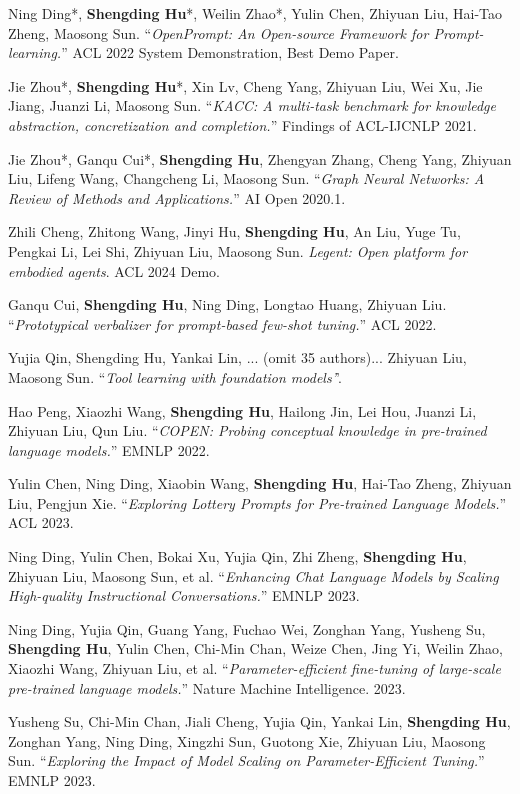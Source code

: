 \begin{resume}
\begin{achievements}
        \item Ning Ding*, \textbf{Shengding Hu}*, Weilin Zhao*, Yulin Chen, Zhiyuan Liu, Hai-Tao Zheng, Maosong Sun. ``\textit{OpenPrompt: An Open-source Framework for Prompt-learning.}'' ACL 2022 System Demonstration, Best Demo Paper.
        \item Jie Zhou*, \textbf{Shengding Hu}*, Xin Lv, Cheng Yang, Zhiyuan Liu, Wei Xu, Jie Jiang, Juanzi Li, Maosong Sun. ``\textit{KACC: A multi-task benchmark for knowledge abstraction, concretization and completion.}'' Findings of  ACL-IJCNLP 2021.
        \item Jie Zhou*, Ganqu Cui*, \textbf{Shengding Hu}, Zhengyan Zhang, Cheng Yang, Zhiyuan Liu, Lifeng Wang, Changcheng Li, Maosong Sun. ``\textit{Graph Neural Networks: A Review of Methods and Applications.}'' AI Open 2020.1.
        \item Zhili Cheng, Zhitong Wang, Jinyi Hu, \textbf{Shengding Hu}, An Liu, Yuge Tu, Pengkai Li, Lei Shi, Zhiyuan Liu, Maosong Sun. \textit{Legent: Open platform for embodied agents}. ACL 2024 Demo.
        \item Ganqu Cui, \textbf{Shengding Hu}, Ning Ding, Longtao Huang, Zhiyuan Liu. ``\textit{Prototypical verbalizer for prompt-based few-shot tuning.}'' ACL 2022.
        \item Yujia Qin, Shengding Hu, Yankai Lin, ... (omit 35 authors)... Zhiyuan Liu, Maosong Sun. ``\textit{Tool learning with foundation models'}'.   
        \item Hao Peng, Xiaozhi Wang, \textbf{Shengding Hu}, Hailong Jin, Lei Hou, Juanzi Li, Zhiyuan Liu, Qun Liu. ``\textit{COPEN: Probing conceptual knowledge in pre-trained language models.}'' EMNLP 2022.
        \item Yulin Chen, Ning Ding, Xiaobin Wang, \textbf{Shengding Hu}, Hai-Tao Zheng, Zhiyuan Liu, Pengjun Xie. ``\textit{Exploring Lottery Prompts for Pre-trained Language Models.}'' ACL 2023.
        \item Ning Ding, Yulin Chen, Bokai Xu, Yujia Qin, Zhi Zheng, \textbf{Shengding Hu}, Zhiyuan Liu, Maosong Sun, et al. ``\textit{Enhancing Chat Language Models by Scaling High-quality Instructional Conversations.}'' EMNLP 2023.
        \item Ning Ding, Yujia Qin, Guang Yang, Fuchao Wei, Zonghan Yang, Yusheng Su, \textbf{Shengding Hu}, Yulin Chen, Chi-Min Chan, Weize Chen, Jing Yi, Weilin Zhao, Xiaozhi Wang, Zhiyuan Liu, et al. ``\textit{Parameter-efficient fine-tuning of large-scale pre-trained language models.}'' Nature Machine Intelligence. 2023.
        \item Yusheng Su, Chi-Min Chan, Jiali Cheng, Yujia Qin, Yankai Lin, \textbf{Shengding Hu}, Zonghan Yang, Ning Ding, Xingzhi Sun, Guotong Xie, Zhiyuan Liu, Maosong Sun. ``\textit{Exploring the Impact of Model Scaling on Parameter-Efficient Tuning.}'' EMNLP 2023.
  \end{achievements}

\end{resume}
